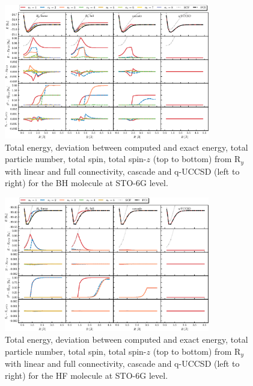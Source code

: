 \documentclass[aps,pra,twocolumn]{revtex4-2}
\begin{document}
\begin{figure}[t!]
\includegraphics[width=0.8\textwidth]{../figures/second_quantization_bh/second_quantization_bh.eps}
\caption{Total energy, deviation between computed and exact energy, total particle number, total spin, total spin-$z$ (top to bottom) from R$_y$ with linear and full connectivity, cascade and q-UCCSD (left to right) for the BH molecule at STO-6G level.}
\label{figure:second_bh}
\end{figure}

\begin{figure}[t!]
\includegraphics[width=0.8\textwidth]{../figures/second_quantization_hf/second_quantization_hf.eps}
\caption{Total energy, deviation between computed and exact energy, total particle number, total spin, total spin-$z$ (top to bottom) from R$_y$ with linear and full connectivity, cascade and q-UCCSD (left to right) for the HF molecule at STO-6G level.}
\label{figure:second_hf}
\end{figure}
\end{document}
